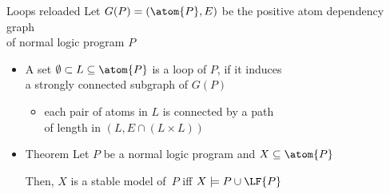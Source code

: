 \begin{frame}{Loops reloaded}
  \bigskip
  Let $G(P) = (\atom{P},E)$ be the positive atom dependency graph\\ of normal logic program $P$
  \par
  \smallskip
  \begin{itemize}
  \item<2-> A set $\emptyset\subset L \subseteq \atom{P}$ is a \alert{loop} of $P$,
    if it induces\\a{} strongly connected subgraph of $G(P)$
    \begin{itemize}\normalsize
    \item[\itarrow] each pair of atoms in $L$ is connected by a path\\
      of length in $(L,E\cap(L \times L))$
    \end{itemize}
    \medskip
  \item<5->[] \par
    \begin{minipage}[t]{0.8\linewidth}
      \begin{block}{Theorem}
        Let $P$ be a normal logic program and $X\subseteq\atom{P}$
        \par\medskip
        Then, $X$ is a stable model of~$P$ iff $X\models P\cup\LF{P}$
      \end{block}
    \end{minipage}
  \end{itemize}
\end{frame}
%
